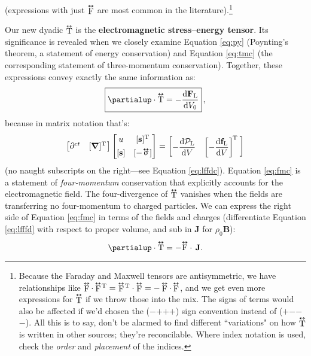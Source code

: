 \documentclass[12pt]{article}
\renewcommand{\vv}[1]{\mathbf{#1}}
\newcommand{\dd}[1]{\mathrm{d}#1}
\newcommand{\del}{\boldsymbol{\nabla}}
\newcommand{\tightoverset}[2]{%
  \mathop{#2}\limits^{\vbox to -.5ex{\kern-0.75ex\hbox{$#1$}\vss}}}
\newcommand{\inlinedy}[1]{\tightoverset{\text{\tiny$\bm\leftrightarrow$}}{#1}}
\newcommand{\fnoverset}[2]{%
  \mathop{#2}\limits^{\vbox to -.5ex{\kern-0.85ex\hbox{$#1$}\vss}}}
\newcommand{\footnotedy}[1]{\fnoverset{\text{\tiny$\bm\leftrightarrow$}}{#1}}
\newcommand{\capdy}[1]{ \overset{ \text{\tiny$\bm\leftrightarrow$} }{\vphantom{\text{\small{A}}}\smash{#1}} }
\begin{document}
(expressions with just $\inlinedy{\mathrm{F}}$ are most common in the literature).\footnote{Because the Faraday and Maxwell tensors are antisymmetric, we have relationships like $\footnotedy{\mathrm{F}} \cdot \footnotedy{\mathrm{F}} \mkern-2mu^\mathrm{T} = \footnotedy{\mathrm{F}} \mkern-2mu^\mathrm{T} \cdot \footnotedy{\mathrm{F}} = - \footnotedy{\mathrm{F}} \cdot \footnotedy{\mathrm{F}}$, and we get even more expressions for $\footnotedy{\mathrm{T}}$ if we throw those into the mix. The signs of terms would also be affected if we'd chosen the ($-$$+$$+$$+$) sign convention instead of ($+$$-$$-$$-$). All this is to say, don't be alarmed to find different ``variations" on how $\footnotedy{\mathrm{T}}$ is written in other sources; they're reconcilable. Where index notation is used, check the \emph{order} and \emph{placement} of the indices.}

Our new dyadic $\inlinedy{\mathrm{T}}$ is the \textbf{electromagnetic stress--energy tensor}. Its significance is revealed when we closely examine Equation \ref{eq:py} (Poynting's theorem, a statement of energy conservation) and Equation \ref{eq:tmc} (the corresponding statement of three-momentum conservation). Together, these expressions convey exactly the same information as:
\begin{equation}\label{eq:fmc}
\boxed{ \partialup \cdot \capdy{\mathrm{T}} = - \dfrac{\dd \vv F_{\mathrm{L}}}{\dd V_0} } \, ,
\end{equation}
because in matrix notation that's:
\begin{equation*}
\begin{bmatrix}
\partial^{ct} & [ \del ]^{\mathrm{T}} \mkern1mu
\end{bmatrix}
\begin{bmatrix}
u & [\vv s]^{\mathrm{T}} \\[1ex]
[\vv s] & [ - \mkern-2mu \inlinedy{\upsigma} \mkern1mu ]
\end{bmatrix}
=
\begin{bmatrix}
- \dfrac{\dd \mathcal{P}_{\textrm{L}}}{\dd V} & \left[ - \dfrac{\dd \vv f_{\mathrm{L}}}{\dd V} \right] ^{\mkern-2mu \mathrm{T} \; }
\end{bmatrix}
\end{equation*}
(no naught subscripts on the right---see Equation \ref{eq:lffdc}). Equation \ref{eq:fmc} is a statement of \emph{four-momentum} conservation that explicitly accounts for the electromagnetic field. The four-divergence of $\inlinedy{\mathrm{T}}$ vanishes when the fields are transferring no four-momentum to charged particles. We can express the right side of Equation \ref{eq:fmc} in terms of the fields and charges (differentiate Equation \ref{eq:lfffd} with respect to proper volume, and sub in $\vv J$ for $\rho_0 \vv B$):
\begin{equation*}
\partialup \cdot \capdy{\mathrm{T}} = - \capdy{\mathrm{F}} \cdot \, \vv J .
\end{equation*}
\end{document}
